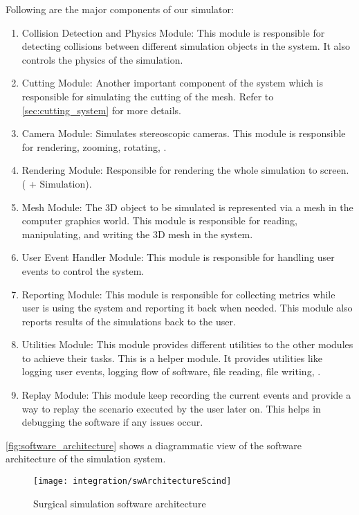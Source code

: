 Following are the major components of our simulator:
\begin{enumerate}
  \item Collision Detection and Physics Module: This module is responsible for detecting collisions between different simulation objects in the system. It also controls the  physics of the simulation.
  \item Cutting Module: Another important component of the system which is responsible for simulating the cutting of the mesh. Refer to \autoref{sec:cutting_system} for more details.
  \item Camera Module: Simulates stereoscopic cameras. This module is responsible for rendering, zooming, rotating, \etc.
  \item Rendering Module: Responsible for rendering the whole simulation to screen. ( + Simulation).
  \item Mesh Module: The 3D object to be simulated is represented via a mesh in the computer graphics world. This module is responsible for reading, manipulating, and writing the 3D mesh in the system.
  \item User Event Handler Module: This module is responsible for handling user events to control the system.
  \item Reporting Module: This module is responsible for collecting metrics while user is using the system and reporting it back when needed. This module also reports results of the simulations back to the user.
  \item Utilities Module: This module provides different utilities to the other modules to achieve their tasks. This is a helper module. It provides utilities like logging user events, logging flow of software, file reading, file writing, \etc.
  \item Replay Module: This module keep recording the current events and provide a way to replay the scenario executed by the user later on. This helps in debugging the software if any issues occur.
\end{enumerate}

\autoref{fig:software_architecture} shows a diagrammatic view of the software architecture of the simulation system.
\begin{sidewaysfigure}
  \centering
  \texttt{[image: integration/swArchitectureScind]}
  \caption{Surgical simulation software architecture}\label{fig:software_architecture}
\end{sidewaysfigure}

